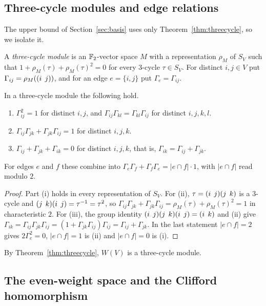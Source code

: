 \subsection{Three-cycle modules and edge relations}

The upper bound of Section~\ref{sec:basis} uses only Theorem~\ref{thm:threecycle}, so we isolate it.

\begin{definition}\label{def:tcr}
A \emph{three-cycle module} is an $\mathbb{F}_2$-vector space $M$ with a representation $\rho_M$ of $S_V$ such that $1+\rho_M(\tau)+{\rho_M(\tau)}^2=0$ for every $3$-cycle $\tau\in S_V$. For distinct $i,j\in V$ put $\Gamma_{ij}=\rho_M((i\;\,j))$, and for an edge $e=\{i,j\}$ put $\Gamma_e=\Gamma_{ij}$.
\end{definition}

\begin{proposition}\label{prop:edge}
In a three-cycle module the following hold.
\begin{enumerate}
\item $\Gamma_{ij}^2=1$ for distinct $i,j$, and $\Gamma_{ij}\Gamma_{kl}=\Gamma_{kl}\Gamma_{ij}$ for distinct $i,j,k,l$.
\item $\Gamma_{ij}\Gamma_{jk}+\Gamma_{jk}\Gamma_{ij}=1$ for distinct $i,j,k$.
\item $\Gamma_{ij}+\Gamma_{jk}+\Gamma_{ik}=0$ for distinct $i,j,k$, that is, $\Gamma_{ik}=\Gamma_{ij}+\Gamma_{jk}$.
\end{enumerate}
For edges $e$ and $f$ these combine into $\Gamma_e\Gamma_f+\Gamma_f\Gamma_e=|e\cap f|\cdot 1$, with $|e\cap f|$ read modulo $2$.
\end{proposition}

\begin{proof}
Part (i) holds in every representation of $S_V$. For (ii), $\tau=(i\;\,j)(j\;\,k)$ is a $3$-cycle and $(j\;\,k)(i\;\,j)=\tau^{-1}=\tau^2$, so $\Gamma_{ij}\Gamma_{jk}+\Gamma_{jk}\Gamma_{ij}=\rho_M(\tau)+{\rho_M(\tau)}^2=1$ in characteristic $2$. For (iii), the group identity $(i\;\,j)(j\;\,k)(i\;\,j)=(i\;\,k)$ and (ii) give $\Gamma_{ik}=\Gamma_{ij}\Gamma_{jk}\Gamma_{ij}=(1+\Gamma_{jk}\Gamma_{ij})\Gamma_{ij}=\Gamma_{ij}+\Gamma_{jk}$. In the last statement $|e\cap f|=2$ gives $2\Gamma_e^2=0$, $|e\cap f|=1$ is (ii) and $|e\cap f|=0$ is (i).
\end{proof}

By Theorem~\ref{thm:threecycle}, $W(V)$ is a three-cycle module.

\subsection{The even-weight space and the Clifford homomorphism}\label{subsec:clifford}

